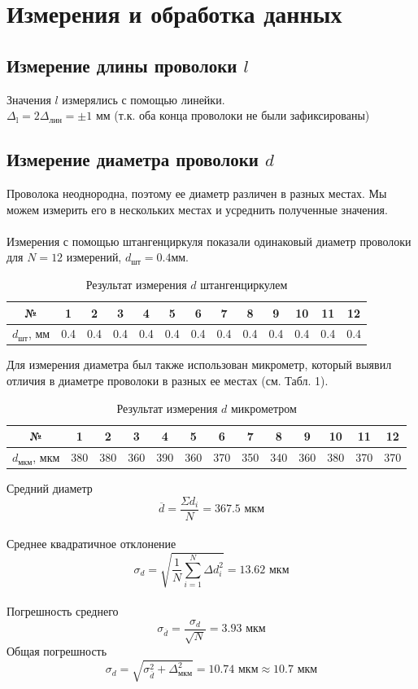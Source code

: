 \documentclass{article}
\begin{document}
	\section{Измерения и обработка данных}
	
	\subsection{Измерение длины проволоки $l$}
	Значения $l$ измерялись с помощью линейки.\\
	$\Delta_{\text{l}} = 2\Delta_{\text{лин}} = \pm 1\text{ мм}$ (т.к. оба конца проволоки не были зафиксированы)
	
	\subsection{Измерение диаметра проволоки $d$}
	Проволока неоднородна, поэтому ее диаметр различен в разных местах. Мы можем измерить его в нескольких местах и усреднить полученные значения.\\\\
	Измерения с помощью штангенциркуля показали одинаковый диаметр проволоки для $N = 12$ измерений, $d_{\text{шт}} = 0.4 \text{мм}$.\\
	
	\begin{table}[H]
		\centering
		\begin{tabular}{|c|c|c|c|c|c|c|c|c|c|c|c|c|}
			\hline
			№ & 1 & 2 & 3 & 4 & 5 & 6 & 7 & 8 & 9 & 10 & 11 & 12 \\ \hline
			$d_{\text{шт}}$, мм & 0.4 & 0.4 & 0.4 & 0.4 & 0.4 & 0.4 & 0.4 & 0.4 & 0.4 & 0.4 & 0.4 & 0.4 \\ \hline
		\end{tabular}
		\caption{Результат измерения $d$ штангенциркулем}
	\end{table}
	Для измерения диаметра был также использован микрометр, который выявил отличия в диаметре проволоки в разных ее местах (см. Табл. 1).
	
	\begin{table}[H]
		
		\centering
		\begin{tabular}{|c|c|c|c|c|c|c|c|c|c|c|c|c|}
			\hline
			№ & 1 & 2 & 3 & 4 & 5 & 6 & 7 & 8 & 9 & 10 & 11 & 12 \\ \hline
			$d_{\text{мкм}}$, мкм & 380 & 380 & 360 & 390 & 360 & 370 & 350 & 340 & 360 & 380 & 370 & 370 \\ \hline
		\end{tabular}
		\caption{Результат измерения $d$ микрометром}
	\end{table}
	Средний диаметр $$\overline{d} = \frac{\Sigma d_{i}}{N} = 367.5 \text{ мкм}$$\\
	Среднее квадратичное отклонение $$\sigma_{d} = \sqrt{\frac{1}{N}\sum_{i = 1}^{N} \Delta d^{2}_{i}} = 13.62 \text{ мкм}$$\\
	Погрешность среднего $$\sigma_{\overline{d}} = \frac{\sigma_{d}}{\sqrt{N}} = 3.93 \text{ мкм}$$
	Общая погрешность $$\sigma_{d} = \sqrt{\sigma_{\overline{d}}^{2} + \Delta_{\text{мкм}}^{2}} = 10.74 \text{ мкм} \approx 10.7 \text{ мкм}$$\\
	
\end{document}
